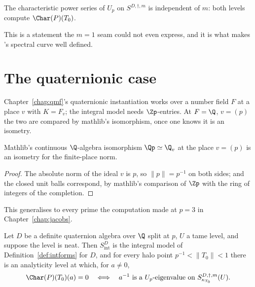 \begin{corollary}
  \label{cor:level-independence}
  \leanok
  The characteristic power series of $U_p$ on $S^{D,\dagger,m}$ is independent of $m$: both
  levels compute $\Char(P)(T_0)$.
\end{corollary}

This is a statement the $m=1$ seam could not even express, and it is what makes
\cite[Definition 2.13]{LWX}'s spectral curve well defined.

\section{The quaternionic case}

Chapter~\ref{chap:qmf}'s quaternionic instantiation works over a number field $F$ at a place $v$
with $K = F_v$; the integral model needs $\Zp$-entries.  At $F=\Q$, $v = (p)$ the two are
compared by mathlib's isomorphism, once one knows it is an isometry.

\begin{lemma}
  \label{lem:adic-completion-isometry}
  \leanok
  Mathlib's continuous $\Q$-algebra isomorphism $\Qp \simeq \Q_v$ at the place $v = (p)$ is an
  isometry for the finite-place norm.
\end{lemma}

\begin{proof}
  \leanok
  The absolute norm of the ideal $v$ is $p$, so $\lVert p\rVert = p^{-1}$ on both sides; and the
  closed unit balls correspond, by mathlib's comparison of $\Zp$ with the ring of integers of the
  completion.
\end{proof}

This generalises to every prime the computation made at $p=3$ in Chapter~\ref{chap:jacobs}.

\begin{theorem}
  \label{thm:lwx-spectral}
  \leanok
  Let $D$ be a definite quaternion algebra over $\Q$ split at $p$, $U$ a tame level, and suppose
  the level is neat.  Then $S^{D}_{\mathrm{int}}$ is the integral model of
  Definition~\ref{def:intforms} for $D$, and for every halo point $p^{-1}<\lVert T_0\rVert<1$
  there is an analyticity level at which, for $a \neq 0$,
  \[
    \Char(P)(T_0)(a) = 0
    \quad\Longleftrightarrow\quad
    a^{-1} \text{ is a } U_p\text{-eigenvalue on } S^{D,\dagger,m}_{\kappa_{T_0}}(U).
  \]
\end{theorem}


